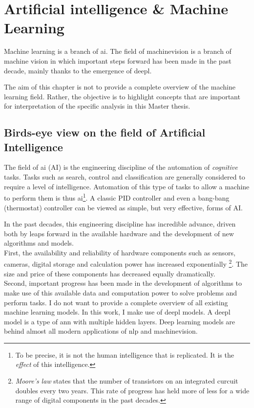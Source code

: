 \chapter{Artificial intelligence \& Machine Learning}

Machine learning is a branch of \Gls{ai}. 
The field of \Gls{machinevision} is a branch of machine vision in which important steps forward has been made in the past decade, mainly thanks to the emergence of \Gls{deepl}.

The aim of this chapter is not to provide a complete overview of the machine learning field.
Rather, the objective is to highlight concepts that are important for interpretation of the specific analysis in this Master thesis.

\section{Birds-eye view on the field of Artificial Intelligence}

The field of \Gls{ai} (AI) is the engineering discipline of the automation of \textit{cognitive} tasks.
Tasks such as search, control and classification are generally considered to require a level of intelligence. 
Automation of this type of tasks to allow a machine to perform them is thus \Gls{ai}\footnote{To be precise, it is not the human intelligence that is replicated. It is the \textit{effect} of this intelligence.}.
A classic PID controller and even a bang-bang (thermostat) controller can be viewed as simple, but very effective, forms of AI.


In the past decades, this engineering discipline has incredible advance, driven both by leaps forward in the available hardware and the development of new algorithms and models. \\
First, the availability and reliability of hardware components such as sensors, cameras, digital storage and calculation power has increased exponentially 
\footnote{ \textit{Moore's law} states that the number of transistors on an integrated curcuit doubles every two years. This rate of progress has held more of less for a wide range of digital components in the past decades.}.
The size and price of these components has decreased equally dramatically. \\
Second, important progress has been made in the development of algorithms to make use of this available data and computation power to solve problems and perform tasks.
I do not want to provide a complete overview of all existing machine learning models. 
In this work, I make use of \Gls{deepl} models.
A \Gls{deepl} model is a type of \acrfull{ann} with multiple hidden layers. 
Deep learning models are behind almost all modern applications of \acrfull{nlp} and \Gls{machinevision}.

